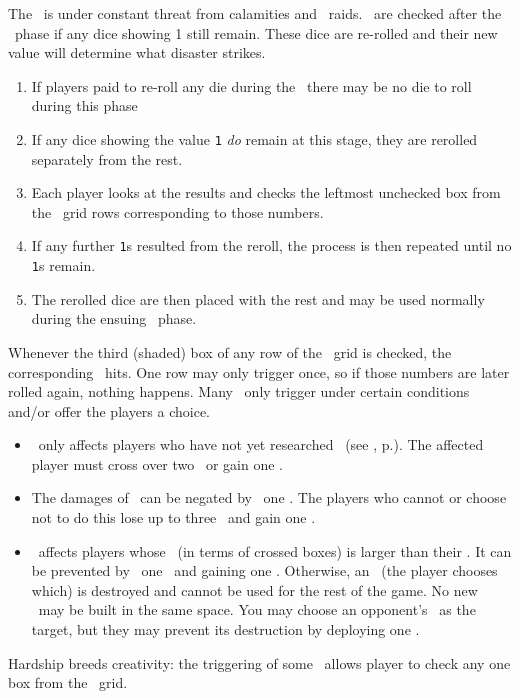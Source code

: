The \planet\ is under constant threat from calamities and \pirate\ raids.  
\disasters\ are checked after the \diplomacy\ phase if any dice showing 1 still 
remain.  These dice are re-rolled and their new value will determine what 
disaster strikes.
\begin{enumerate}
  \item If players paid to re-roll any die during the \diplomacy\ there may be 
        no die to roll during this phase
  \item If any dice showing the value \texttt{1} \textit{do} remain at this 
        stage, they are rerolled separately from the rest.
  \item Each player looks at the results and checks the leftmost unchecked box 
        from the \disaster\ grid rows corresponding to those numbers.
  \item If any further \texttt{1}s resulted from the reroll, the process is then
        repeated until no \texttt{1}s remain.
  \item The rerolled dice are then placed with the rest and may be used normally
        during the ensuing \development\ phase.
\end{enumerate}
Whenever the third (shaded) box of any row of the \disaster\ grid is checked, 
the corresponding \disaster\ hits.  One row may only trigger once, so if those 
numbers are later rolled again, nothing happens.
\newline\newline
Many \disasters\ only trigger under certain conditions and/or offer the players
a choice.
\begin{itemize}
  \item \pandemic\ only affects players who have not yet researched \cure\ 
        (see , p.\pageref{sec:disasters}). The affected 
        player must cross over two \population\ or gain one \unhappiness.
  \item The damages of \war\ can be negated by \deploying\ one \squadron.  The 
        players who cannot or choose not to do this lose up to three \currency\ 
        and gain one \unhappiness.
  \item \terrorism\ affects players whose \unhappiness\ (in terms of crossed 
        boxes) is larger than their \happiness.  It can be prevented by 
        \deploying\ one \squadron\ and gaining one \unhappiness.  Otherwise, an 
        \armament\ (the player chooses which) is destroyed and cannot be used 
        for the rest of the game.  No new \armaments\ may be built in the same 
        space.  You may choose an opponent's \battleship\ as the target, but 
        they may prevent its destruction by deploying one \squadron.
\end{itemize}
Hardship breeds creativity: the triggering of some \disasters\ allows player to 
check any one box from the \culture\ grid.
